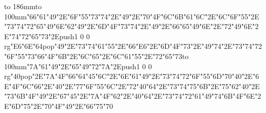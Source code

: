 \hbox to 186mm{\hsize=81mm\vbox to 100mm{\vfill\ipa\char"66\ipa\char"61\ipa\char"49\ipa\char"2E\ipa\char"6F\ipa\char"55\ipa\char"73\ipa\char"74\ipa\char"2E\ipa\char"49\ipa\char"2E\ipa\char"70\ipa\char"4F\ipa\char"6C\medskip\ipa\char"6B\ipa\char"61\ipa\char"6C\ipa\char"2E\ipa\char"6C\ipa\char"6F\ipa\char"55\ipa\char"2E\ipa\char"73\ipa\char"74\ipa\char"72\ipa\char"65\ipa\char"49\ipa\char"6E\medskip\ipa\char"62\ipa\char"49\ipa\char"2E\ipa\char"6D\ipa\char"4F\ipa\char"73\ipa\char"74\ipa\char"2E\ipa\char"49\ipa\char"2E\ipa\char"66\ipa\char"65\ipa\char"49\ipa\char"6E\ipa\char"2E\ipa\char"72\ipa\char"49\ipa\char"6E\ipa\char"2E\ipa\char"74\ipa\char"72\ipa\char"65\ipa\char"73\ipa\char"2E\pdfcolorstack\match push{1 0 0 rg}\ipa\char"E6\ipa\char"6E\ipa\char"64\pdfcolorstack\match pop{}\medskip\ipa\char"49\ipa\char"2E\ipa\char"73\ipa\char"74\ipa\char"61\ipa\char"55\ipa\char"2E\ipa\char"66\ipa\char"E6\ipa\char"2E\ipa\char"6D\ipa\char"4F\ipa\char"73\ipa\char"2E\ipa\char"49\ipa\char"74\ipa\char"2E\ipa\char"73\ipa\char"74\ipa\char"72\ipa\char"6F\ipa\char"55\ipa\char"73\medskip\ipa\char"66\ipa\char"4F\ipa\char"6B\ipa\char"2E\ipa\char"6C\ipa\char"65\ipa\char"2E\ipa\char"6C\ipa\char"61\ipa\char"55\ipa\char"2E\ipa\char"72\ipa\char"65\ipa\char"73\vfill}\hfill\vbox to 100mm{\vfill\ipa\char"7A\ipa\char"61\ipa\char"49\ipa\char"2E\ipa\char"65\ipa\char"49\ipa\char"72\ipa\char"7A\ipa\char"2E\pdfcolorstack\match push{1 0 0 rg}\ipa\char"40\pdfcolorstack\match pop{}\ipa\char"2E\ipa\char"7A\ipa\char"4F\ipa\char"66\medskip\ipa\char"64\ipa\char"45\ipa\char"6C\ipa\char"2E\ipa\char"6E\ipa\char"61\ipa\char"49\ipa\char"2E\ipa\char"73\ipa\char"74\ipa\char"72\ipa\char"6F\ipa\char"55\ipa\char"6D\medskip\ipa\char"70\ipa\char"40\ipa\char"2E\ipa\char"6E\ipa\char"4F\ipa\char"6C\ipa\char"66\ipa\char"2E\ipa\char"40\ipa\char"2E\ipa\char"77\ipa\char"6F\ipa\char"55\ipa\char"6C\ipa\char"2E\ipa\char"72\ipa\char"40\ipa\char"64\ipa\char"2E\ipa\char"73\ipa\char"74\ipa\char"75\ipa\char"6B\ipa\char"2E\ipa\char"75\ipa\char"62\medskip\ipa\char"40\ipa\char"2E\ipa\char"73\ipa\char"6B\ipa\char"4F\ipa\char"49\ipa\char"2E\ipa\char"67\ipa\char"45\ipa\char"2E\ipa\char"7A\ipa\char"4F\ipa\char"62\ipa\char"2E\ipa\char"40\ipa\char"64\ipa\char"2E\ipa\char"73\ipa\char"74\ipa\char"72\ipa\char"61\ipa\char"49\ipa\char"74\medskip\ipa\char"6B\ipa\char"4F\ipa\char"6E\ipa\char"2E\ipa\char"6D\ipa\char"75\ipa\char"2E\ipa\char"70\ipa\char"4F\ipa\char"49\ipa\char"2E\ipa\char"66\ipa\char"75\ipa\char"70\vfill}}\eject
